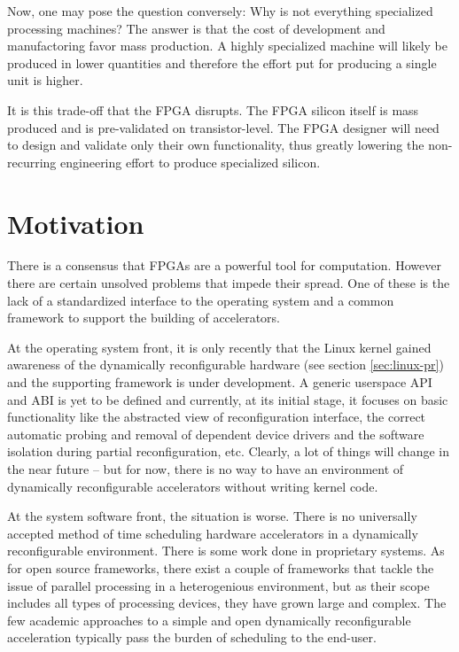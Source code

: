 Now, one may pose the question conversely: Why is not everything specialized processing machines?
The answer is that the cost of development and manufactoring favor mass production.
A highly specialized machine will likely be produced in lower quantities and therefore the
effort put for producing a single unit is higher. 

It is this trade-off that the FPGA disrupts. The FPGA silicon itself is mass produced and is pre-validated
on transistor-level. The FPGA designer will need to design and validate only their own functionality,
thus greatly lowering the non-recurring engineering effort to produce specialized silicon.

\section{Motivation}

There is a consensus that FPGAs are a powerful tool for computation. 
However there are certain unsolved problems that impede their spread. 
One of these is the lack of a standardized interface to the operating system
and a common framework to support the building of accelerators. 

At the operating system front, it is only recently that 
the Linux kernel gained awareness of the dynamically reconfigurable hardware
(see section \ref{sec:linux-pr}) and the supporting framework is under development.
A generic userspace API and ABI is yet to be defined 
and currently, at its initial stage, it focuses on basic functionality
like the abstracted view of reconfiguration interface, 
the correct automatic probing and removal of dependent device drivers 
and the software isolation during partial reconfiguration, etc.
Clearly, a lot of things will change in the near future -- but for now,
there is no way to have an environment of dynamically reconfigurable accelerators
without writing kernel code.

At the system software front, the situation is worse.
There is no universally accepted method of time scheduling hardware accelerators
in a dynamically reconfigurable environment. There is some work done in proprietary
systems. As for open source frameworks, there exist a couple of frameworks
that tackle the issue of parallel processing in a heterogenious environment,
but as their scope includes all types of processing devices, they have grown large and complex.
The few academic approaches to a simple and open dynamically reconfigurable acceleration 
typically pass the burden of scheduling to the end-user.


